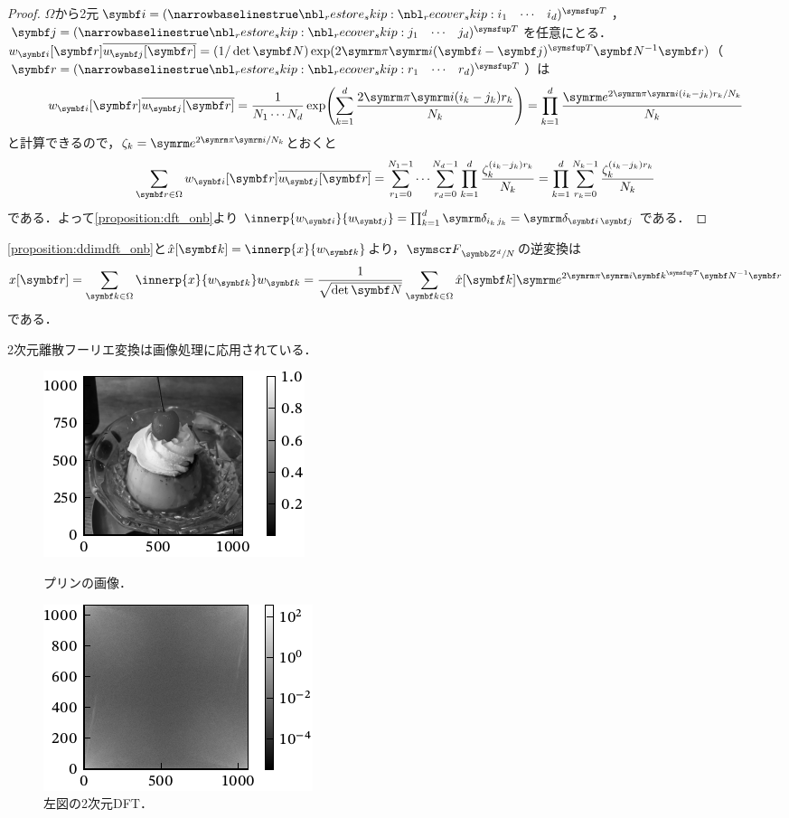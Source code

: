 \documentclass[../../main]{subfiles}
\begin{document}
\begin{proof}
  \(\Omega\)から2元\(\vect{i}=\trps{\rowvect{i_1 & \cdots & i_d}}\)，\(\vect{j}=\trps{\rowvect{j_1 & \cdots & j_d}}\)を任意にとる．
  \(w_{\vect{i}}[\vect{r}]\conj*{w_{\!\vect{j}}[\vect{r}]}=(1/\det\mat{N})\exp(2\krez\iuni\trps{(\vect{i}-\vect{j})}\mat{N}^{-1}\vect{r})\)（\(\vect{r}=\trps{\rowvect{r_1 & \cdots & r_d}}\)）は
  \[
    w_{\vect{i}}[\vect{r}]\conj*{w_{\!\vect{j}}[\vect{r}]} = \frac{1}{N_1\dotsm N_d}\exp\pqty*{\sum_{k=1}^d\frac{2\krez\iuni(i_k-j_k)r_k}{N_k}}
    = \prod_{k=1}^d\frac{\napr^{2\krez\iuni(i_k-j_k)r_k/N_k}}{N_k}
  \]
  と計算できるので，\(\zeta_k=\napr^{2\krez\iuni/N_k}\)とおくと
  \[
    \sum_{\vect{r}\in\Omega}w_{\vect{i}}[\vect{r}]\conj*{w_{\!\vect{j}}[\vect{r}]} = \sum_{r_1=0}^{N_1-1}\dotsm\sum_{r_d=0}^{N_d-1}\prod_{k=1}^d\frac{\zeta_k^{(i_k-j_k)r_k}}{N_k}
    = \prod_{k=1}^d\sum_{r_k=0}^{N_k-1}\frac{\zeta_k^{(i_k-j_k)r_k}}{N_k}
  \]
  である．よって\cref{proposition:dft_onb}より\(\innerp{w_{\vect{i}}}{w_{\!\vect{j}}}=\prod_{k=1}^d\kdelta{i_k}{j_k}=\kdelta{\vect{i}}{\vect{j}}\)である．
\end{proof}

\cref{proposition:ddimdft_onb}と\(\hat{x}[\vect{k}]=\innerp{x}{w_{\vect{k}}}\)より，\(\dft[d]{N}\)の逆変換は
\[
  x[\vect{r}] = \sum_{\vect{k}\in\Omega}\innerp{x}{w_{\vect{k}}}w_{\vect{k}}
  = \frac{1}{\sqrt{\det\mat{N}}}\sum_{\vect{k}\in\Omega}\hat{x}[\vect{k}]\napr^{2\krez\iuni\trps{\vect{k}}\mat{N}^{-1}\vect{r}}
\]
である．

2次元離散フーリエ変換は画像処理に応用されている．

\begin{figure}[htbp]
  \begin{minipage}{\linewidth/2}
    \centering
    \includegraphics{figures/pudding.pdf}
    \caption{プリンの画像．}
    \label{figure:pudding}
  \end{minipage}%
  \begin{minipage}{\linewidth/2}
    \centering
    \includegraphics{figures/pudding_dft.pdf}
    \caption{左図の2次元DFT．}
    \label{figure:pudding_dft}
  \end{minipage}
\end{figure}
\end{document}
